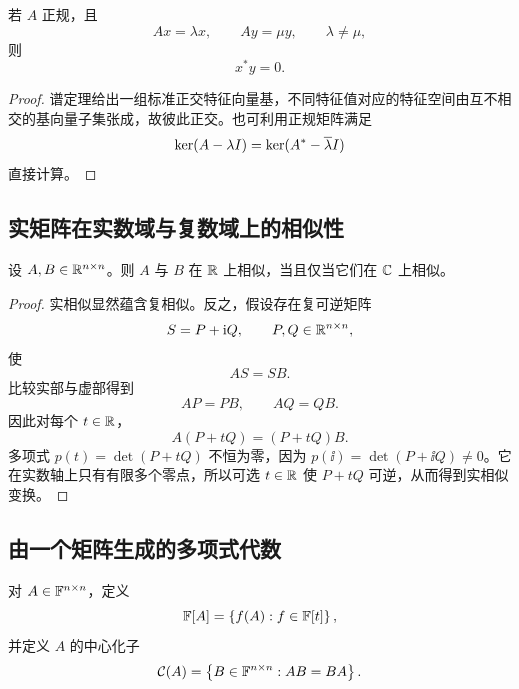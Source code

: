 \begin{theorem}[不同特征值的特征向量正交]
若 $A$ 正规，且
\begin{equation}
 Ax=\lambda x,
 \qquad
 Ay=\mu y,
 \qquad
 \lambda\neq\mu,
\end{equation}
则
\begin{equation}
 x^*y=0.
\end{equation}
\end{theorem}

\begin{proof}
谱定理给出一组标准正交特征向量基，不同特征值对应的特征空间由互不相交的基向量子集张成，故彼此正交。也可利用正规矩阵满足
\begin{equation}
 \operatorname{ker}(A-\lambda I)=\operatorname{ker}(A^*-\overline\lambda I)
\end{equation}
直接计算。
\end{proof}

\subsection{实矩阵在实数域与复数域上的相似性}

\begin{theorem}
设 $A,B\in\mathbb R^{n\times n}$。则 $A$ 与 $B$ 在 $\mathbb R$ 上相似，当且仅当它们在 $\mathbb C$ 上相似。
\end{theorem}

\begin{proof}
实相似显然蕴含复相似。反之，假设存在复可逆矩阵
\begin{equation}
 S=P+\mathrm i Q,
 \qquad P,Q\in\mathbb R^{n\times n},
\end{equation}
使
\begin{equation}
 AS=SB.
\end{equation}
比较实部与虚部得到
\begin{equation}
 AP=PB,
 \qquad
 AQ=QB.
\end{equation}
因此对每个 $t\in\mathbb R$，
\begin{equation}
 A(P+tQ)=(P+tQ)B.
\end{equation}
多项式 $p(t)=\det(P+tQ)$ 不恒为零，因为 $p(\ii)=\det(P+\ii Q)\neq0$。它在实数轴上只有有限多个零点，所以可选 $t\in\mathbb R$ 使 $P+tQ$ 可逆，从而得到实相似变换。
\end{proof}

\subsection{由一个矩阵生成的多项式代数}

\begin{definition}
对 $A\in\mathbb F^{n\times n}$，定义
\begin{equation}
 \mathbb F[A]=\left\{f(A):f\in\mathbb F[t]\right\},
\end{equation}
并定义 $A$ 的中心化子
\begin{equation}
 \mathcal C(A)=\left\{B\in\mathbb F^{n\times n}:AB=BA\right\}.
\end{equation}
\end{definition}

